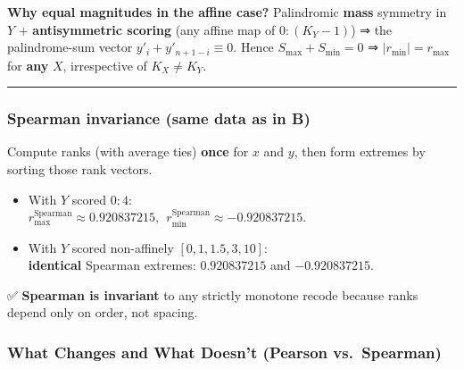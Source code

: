 \documentclass[
  12pt,
]{article}
\theoremstyle{plain}
\theoremstyle{definition}
\theoremstyle{remark}
\begin{document}
\textbf{Why equal magnitudes in the affine case?} Palindromic
\textbf{mass} symmetry in \(Y\) + \textbf{antisymmetric scoring} (any
affine map of \(0{:}(K_Y-1)\)) ⇒ the palindrome-sum vector
\(y'_i+y'_{n+1-i}\equiv 0\). Hence \(S_{\max}+S_{\min}=0\) ⇒
\(|r_{\min}|=r_{\max}\) for \textbf{any} \(X\), irrespective of
\(K_X\neq K_Y\).

\begin{center}\rule{0.5\linewidth}{0.5pt}\end{center}

\subsubsection{\texorpdfstring{\textbf{Spearman invariance (same data as
in
B)}}{Spearman invariance (same data as in B)}}\label{spearman-invariance-same-data-as-in-b}

Compute ranks (with average ties) \textbf{once} for \(x\) and \(y\),
then form extremes by sorting those rank vectors.

\begin{itemize}
\item
  With \(Y\) scored \(0{:}4\):\\
  \(r_{\max}^{\text{Spearman}}\approx 0.920837215,\ \ r_{\min}^{\text{Spearman}}\approx -0.920837215\).
\item
  With \(Y\) scored non-affinely \([0,1,1.5,3,10]\):\\
  \textbf{identical} Spearman extremes: \(0.920837215\) and
  \(-0.920837215\).
\end{itemize}

✅ \textbf{Spearman is invariant} to any strictly monotone recode
because ranks depend only on order, not spacing.

\subsubsection{What Changes and What Doesn't (Pearson
vs.~Spearman)}\label{what-changes-and-what-doesnt-pearson-vs.-spearman}
\end{document}
